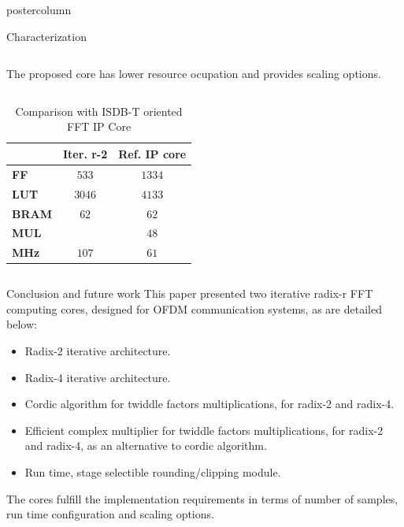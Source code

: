 \documentclass[final]{beamer}
\begin{document}
\begin{frame}{}
\begin{columns}
\begin{column}{.5\textwidth}
\begin{beamercolorbox}[center,wd=\textwidth]{postercolumn}
\begin{minipage}[T]{.99\textwidth}
{\begin{block}{Characterization}
\begin{column}{.39\textwidth}
			The proposed core has lower resource ocupation and provides scaling options.			
			\end{column}
			\vrule
			\begin{column}{.50\textwidth}
				\begin{table}[htb!]
				\caption{Comparison with ISDB-T oriented FFT IP Core}
				\begin{tabular}{l c c }
				 & \textbf{Iter. r-2} & \textbf{Ref. IP core}\\ \hline 
				\textbf{FF} & $533$ & $1334$\\
				\textbf{LUT} & $3046$ & $4133$\\
				\textbf{BRAM} & $62$ & $62$\\
				\textbf{MUL} & $ $ & $48$\\ 
				\textbf{MHz} & $107$ & $61$\\ \hline
				\end{tabular}
				\label{table:iberchipcomp}
				\end{table}
			\end{column}
			
		\end{block}
		
		


        \begin{block}{Conclusion and future work}
          \justify
          This paper presented two iterative radix-r FFT computing cores, designed for OFDM
			communication systems, as are detailed below:
			\begin{itemize}
			  \item Radix-2 iterative architecture.
			  \item Radix-4 iterative architecture.
			  \item Cordic algorithm for twiddle factors multiplications, for radix-2 and radix-4.
			  \item Efficient complex multiplier for twiddle factors multiplications, for radix-2 and radix-4, as an alternative to 
			  cordic algorithm.
			  \item Run time, stage selectible rounding/clipping module. 
			\end{itemize} 
			The cores fulfill the implementation requirements in terms of number of samples, run time configuration and scaling options.
			

\end{block}}
\end{minipage}
\end{beamercolorbox}
\end{column}
\end{columns}
\end{frame}
\end{document}
